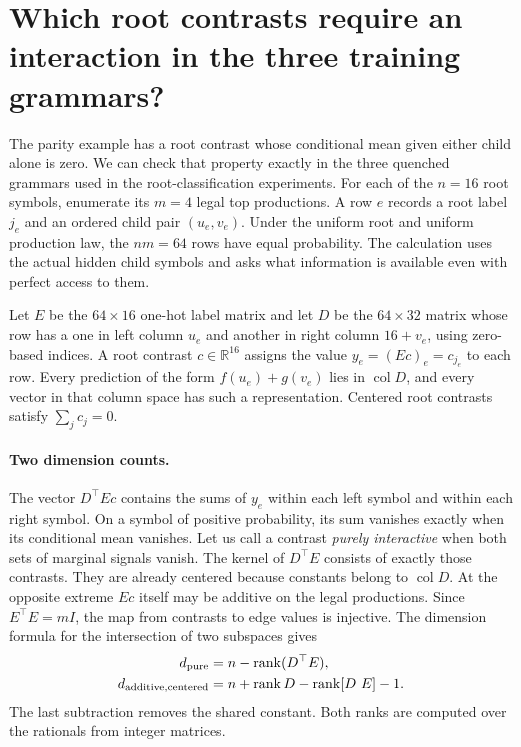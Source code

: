 \section{Which root contrasts require an interaction in the three training grammars?}
\label{sec:rule-audit}

The parity example has a root contrast whose conditional mean given either
child alone is zero. We can check that property exactly in the three
quenched grammars used in the root-classification experiments. For each of
the \(n=16\) root symbols, enumerate its \(m=4\) legal top productions. A
row \(e\) records a root label \(j_e\) and an ordered child pair
\((u_e,v_e)\). Under the uniform root and uniform production law, the
\(nm=64\) rows have equal probability. The calculation uses the actual
hidden child symbols and asks what information is available even with
perfect access to them.

Let \(E\) be the \(64\times16\) one-hot label matrix and let \(D\) be the
\(64\times32\) matrix whose row has a one in left column \(u_e\) and
another in right column \(16+v_e\), using zero-based indices. A root contrast
\(c\in\mathbb R^{16}\) assigns the value \(y_e=(Ec)_e=c_{j_e}\) to
each row. Every prediction of the form \(f(u_e)+g(v_e)\) lies in
\(\operatorname{col}D\), and every vector in that column space has such a
representation. Centered root contrasts satisfy \(\sum_j c_j=0\).

\paragraph{Two dimension counts.}
The vector \(D^\top Ec\) contains the sums of \(y_e\) within each left
symbol and within each right symbol. On a symbol of positive probability,
its sum vanishes exactly when its conditional mean vanishes. Let us call
a contrast \emph{purely interactive} when both sets of marginal signals
vanish. The kernel of \(D^\top E\) consists of exactly those contrasts.
They are already centered because constants belong to \(\operatorname{col}D\).
At the opposite extreme \(Ec\) itself may be additive on the legal
productions. Since \(E^\top E=m I\), the map from contrasts to edge
values is injective. The dimension formula for the intersection of two
subspaces gives
\begin{align}
 d_{\rm pure} &= n-\operatorname{rank}(D^\top E),\\
 d_{\rm additive,centered}
 &= n+\operatorname{rank}D-\operatorname{rank}[D\ E]-1 .
\end{align}
The last subtraction removes the shared constant. Both ranks are computed
over the rationals from integer matrices.

